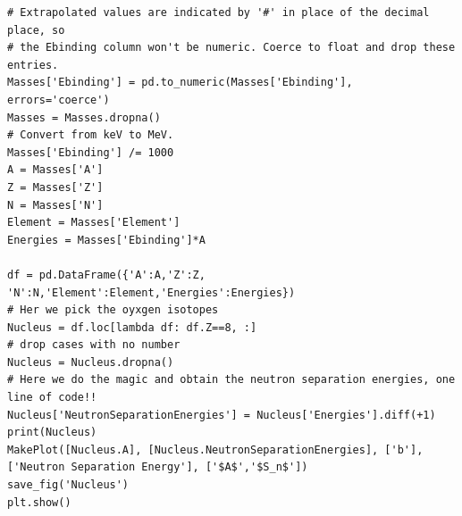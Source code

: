 \documentclass[%
oneside,                 %
final,                   %
10pt]{article}
\begin{document}
\begin{verbatim}
# Extrapolated values are indicated by '#' in place of the decimal place, so
# the Ebinding column won't be numeric. Coerce to float and drop these entries.
Masses['Ebinding'] = pd.to_numeric(Masses['Ebinding'], errors='coerce')
Masses = Masses.dropna()
# Convert from keV to MeV.
Masses['Ebinding'] /= 1000
A = Masses['A']
Z = Masses['Z']
N = Masses['N']
Element = Masses['Element']
Energies = Masses['Ebinding']*A

df = pd.DataFrame({'A':A,'Z':Z, 'N':N,'Element':Element,'Energies':Energies})
# Her we pick the oyxgen isotopes
Nucleus = df.loc[lambda df: df.Z==8, :]
# drop cases with no number
Nucleus = Nucleus.dropna()
# Here we do the magic and obtain the neutron separation energies, one line of code!!
Nucleus['NeutronSeparationEnergies'] = Nucleus['Energies'].diff(+1)
print(Nucleus)
MakePlot([Nucleus.A], [Nucleus.NeutronSeparationEnergies], ['b'], ['Neutron Separation Energy'], ['$A$','$S_n$'])
save_fig('Nucleus')
plt.show()

\end{verbatim}






\end{document}
